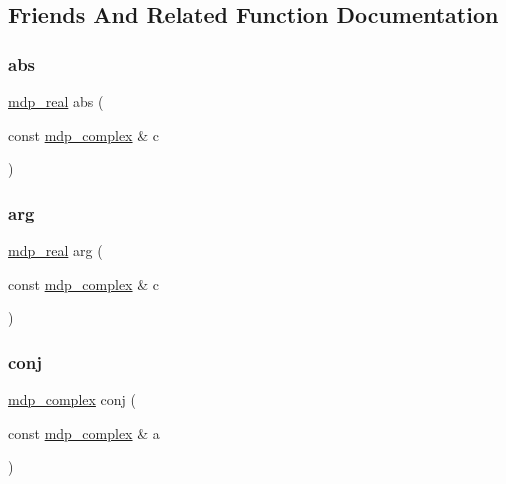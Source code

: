 \subsection{Friends And Related Function Documentation}
\mbox{\label{classmdp__complex_a96b9b3b51ad22585b81f00888633ca37}} 
\subsubsection{\texorpdfstring{abs}{abs}}
{\footnotesize\ttfamily \hyperlink{mdp__global__vars_8h_a69d96b74c791e0bbdb888b3913a69450}{mdp\+\_\+real} abs (\begin{DoxyParamCaption}\item[{const \hyperlink{classmdp__complex}{mdp\+\_\+complex} \&}]{c }\end{DoxyParamCaption})\hspace{0.3cm}{\ttfamily [friend]}}

\mbox{\label{classmdp__complex_ab34d0f24b00ee0467009d6cb6c992ae1}} 
\subsubsection{\texorpdfstring{arg}{arg}}
{\footnotesize\ttfamily \hyperlink{mdp__global__vars_8h_a69d96b74c791e0bbdb888b3913a69450}{mdp\+\_\+real} arg (\begin{DoxyParamCaption}\item[{const \hyperlink{classmdp__complex}{mdp\+\_\+complex} \&}]{c }\end{DoxyParamCaption})\hspace{0.3cm}{\ttfamily [friend]}}

\mbox{\label{classmdp__complex_a87d03a17271a85f700b7fa512c3e7db7}} 
\subsubsection{\texorpdfstring{conj}{conj}}
{\footnotesize\ttfamily \hyperlink{classmdp__complex}{mdp\+\_\+complex} conj (\begin{DoxyParamCaption}\item[{const \hyperlink{classmdp__complex}{mdp\+\_\+complex} \&}]{a }\end{DoxyParamCaption})\hspace{0.3cm}{\ttfamily [friend]}}

